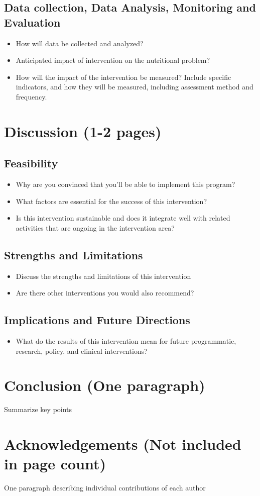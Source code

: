 \documentclass[12pt, letterpaper, draft]{article}
\begin{document}
\subsection{Data collection, Data Analysis, Monitoring and Evaluation}
\begin{itemize}
    \item How will data be collected and analyzed?
    \item Anticipated impact of intervention on the nutritional problem?
    \item How will the impact of the intervention be measured? Include specific
    indicators, and how they will be measured, including assessment method and frequency.
\end{itemize}
\section{Discussion (1-2 pages)}
\subsection{Feasibility}
\begin{itemize}
    \item Why are you convinced that you'll be able to implement this program?
    \item What factors are essential for the success of this intervention?
    \item Is this intervention sustainable and does it integrate well
    with related activities that are ongoing in the intervention area?
\end{itemize}
\subsection{Strengths and Limitations}
\begin{itemize}
    \item Discuss the strengths and limitations of this intervention
    \item Are there other interventions you would also recommend?
\end{itemize}
\subsection{Implications and Future Directions}
\begin{itemize}
    \item What do the results of this intervention mean for future programmatic,
    research, policy, and clinical interventions?
\end{itemize}

\section{Conclusion (One paragraph)}
Summarize key points

\section{Acknowledgements (Not included in page count)}
One paragraph describing individual contributions of each author




\end{document}
